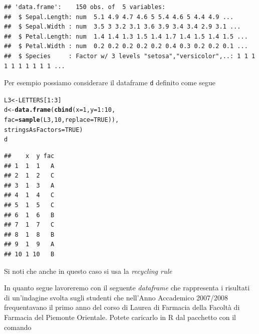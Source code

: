 \documentclass[onecolumn,12pt]{book}\usepackage[]{graphicx}\usepackage[]{color}
\makeatletter
\newcommand{\hlnum}[1]{\textcolor[rgb]{0.686,0.059,0.569}{#1}}%
\newcommand{\hlopt}[1]{\textcolor[rgb]{0,0,0}{#1}}%
\newcommand{\hlstd}[1]{\textcolor[rgb]{0.345,0.345,0.345}{#1}}%
\newcommand{\hlkwb}[1]{\textcolor[rgb]{0.69,0.353,0.396}{#1}}%
\newcommand{\hlkwc}[1]{\textcolor[rgb]{0.333,0.667,0.333}{#1}}%
\newcommand{\hlkwd}[1]{\textcolor[rgb]{0.737,0.353,0.396}{\textbf{#1}}}%
\newenvironment{kframe}{%
 \def\at@end@of@kframe{}%
 \ifinner\ifhmode%
  \def\at@end@of@kframe{\end{minipage}}%
  \begin{minipage}{\columnwidth}%
 \fi\fi%
 \def\FrameCommand##1{\hskip\@totalleftmargin \hskip-\fboxsep
 \colorbox{shadecolor}{##1}\hskip-\fboxsep
     \hskip-\linewidth \hskip-\@totalleftmargin \hskip\columnwidth}%
 \MakeFramed {\advance\hsize-\width
   \@totalleftmargin\z@ \linewidth\hsize
   \@setminipage}}%
 {\par\unskip\endMakeFramed%
 \at@end@of@kframe}
\newenvironment{knitrout}{}{} %
\makeatother
\begin{document}
\small
\begin{knitrout}
\color{fgcolor}\begin{kframe}
\begin{verbatim}
## 'data.frame':	150 obs. of  5 variables:
##  $ Sepal.Length: num  5.1 4.9 4.7 4.6 5 5.4 4.6 5 4.4 4.9 ...
##  $ Sepal.Width : num  3.5 3 3.2 3.1 3.6 3.9 3.4 3.4 2.9 3.1 ...
##  $ Petal.Length: num  1.4 1.4 1.3 1.5 1.4 1.7 1.4 1.5 1.4 1.5 ...
##  $ Petal.Width : num  0.2 0.2 0.2 0.2 0.2 0.4 0.3 0.2 0.2 0.1 ...
##  $ Species     : Factor w/ 3 levels "setosa","versicolor",..: 1 1 1 1 1 1 1 1 1 1 ...
\end{verbatim}
\end{kframe}
\end{knitrout}
\normalsize
Per esempio possiamo considerare il dataframe \texttt{d} definito come segue 
\begin{knitrout}
\color{fgcolor}\begin{kframe}
\begin{alltt}
\hlstd{L3} \hlkwb{<-} \hlstd{LETTERS[}\hlnum{1}\hlopt{:}\hlnum{3}\hlstd{]}
\hlstd{d} \hlkwb{<-} \hlkwd{data.frame}\hlstd{(}\hlkwd{cbind}\hlstd{(}\hlkwc{x}\hlstd{=}\hlnum{1}\hlstd{,} \hlkwc{y}\hlstd{=}\hlnum{1}\hlopt{:}\hlnum{10}\hlstd{,}
\hlkwc{fac}\hlstd{=}\hlkwd{sample}\hlstd{(L3,} \hlnum{10}\hlstd{,} \hlkwc{replace}\hlstd{=}\hlnum{TRUE}\hlstd{)),}
\hlkwc{stringsAsFactors}\hlstd{=}\hlnum{TRUE}\hlstd{)}
\hlstd{d}
\end{alltt}
\begin{verbatim}
##    x  y fac
## 1  1  1   A
## 2  1  2   C
## 3  1  3   A
## 4  1  4   C
## 5  1  5   C
## 6  1  6   B
## 7  1  7   C
## 8  1  8   B
## 9  1  9   A
## 10 1 10   B
\end{verbatim}
\end{kframe}
\end{knitrout}
Si noti che anche in questo caso si usa la \emph{recycling rule}

In quanto segue lavoreremo con il seguente \emph{dataframe} che rappresenta i risultati di un'indagine svolta sugli studenti che nell'Anno Accademico 2007/2008 frequentavano il primo anno del corso di Laurea di Farmacia della Facolt\`a di Farmacia del Piemonte Orientale. Potete caricarlo  in {\textsf R} dal pacchetto con il comando
\end{document}
